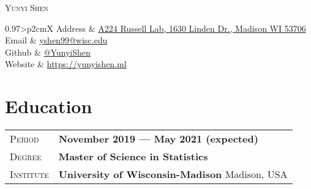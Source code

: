 \documentclass[letterpaper, oneside, final]{scrartcl} %
\begin{document}
	
\begin{center} %


{\fontsize{36}{36}\selectfont\scshape Yunyi Shen} %

\vspace{1.5cm} %
\hspace{-2cm}


\begin{tabularx}{0.97\linewidth}{>{\raggedleft\scshape}p{2cm}X}
	Address & \href{https://www.google.com/maps/place/Russell+Laboratories,+1630+Linden+Dr,+Madison,+WI+53706/@43.0755343,-89.4157108,17z/data=!3m1!4b1!4m5!3m4!1s0x8807acc0bc8b45b9:0x855709798126d445!8m2!3d43.0755304!4d-89.4135221}{A224 Russell Lab, 1630 Linden Dr., Madison WI 53706} \\
	Email & \href{mailto://yshen99@wisc.edu}{yshen99@wisc.edu}\\
	Github & \href{https://github.com/YunyiShen}{@YunyiShen}\\
	Website & \href{https://yunyishen.ml}{https://yunyishen.ml}
\end{tabularx}



\section{Education}
\begin{tabularx}{0.97\linewidth}{>{\raggedleft\scshape}p{2cm}X}
	Period & \textbf{November 2019 --- May 2021 (expected)}\\
	Degree & \textbf{Master of Science in Statistics}\\
	Institute & \textbf{University of Wisconsin-Madison} \hfill Madison, USA\\
\end{tabularx}


\end{center}
\end{document}
